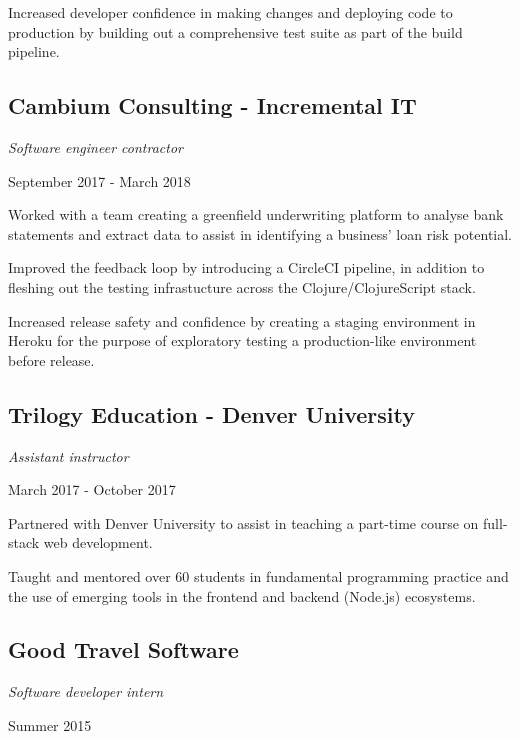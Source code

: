 Increased developer confidence in making changes and deploying code to
production by building out a comprehensive test suite as part of the build
pipeline.

\subsection*{Cambium Consulting - Incremental IT}
\noindent\begin{minipage}[b]{0.5\textwidth}
  \flushleft
  \emph{Software engineer contractor}
\end{minipage}
\noindent\begin{minipage}[b]{0.5\textwidth}
  \flushright
  September 2017 - March 2018
\end{minipage}

Worked with a team creating a greenfield underwriting platform to analyse bank
statements and extract data to assist in identifying a business' loan risk
potential.

Improved the feedback loop by introducing a CircleCI pipeline, in addition
to fleshing out the testing infrastucture across the Clojure/ClojureScript
stack.

Increased release safety and confidence by creating a staging environment in
Heroku for the purpose of exploratory testing a production-like environment
before release.

\subsection*{Trilogy Education - Denver University}
\noindent\begin{minipage}[b]{0.5\textwidth}
  \flushleft
  \emph{Assistant instructor}
\end{minipage}
\noindent\begin{minipage}[b]{0.5\textwidth}
  \flushright
  March 2017 - October 2017
\end{minipage}

Partnered with Denver University to assist in teaching a part-time course on
full-stack web development.

Taught and mentored over 60 students in fundamental programming practice and
the use of emerging tools in the frontend and backend (Node.js) ecosystems.

\subsection*{Good Travel Software}
\noindent\begin{minipage}[b]{0.5\textwidth}
  \flushleft
  \emph{Software developer intern}
\end{minipage}
\noindent\begin{minipage}[b]{0.5\textwidth}
  \flushright
  Summer 2015
\end{minipage}

